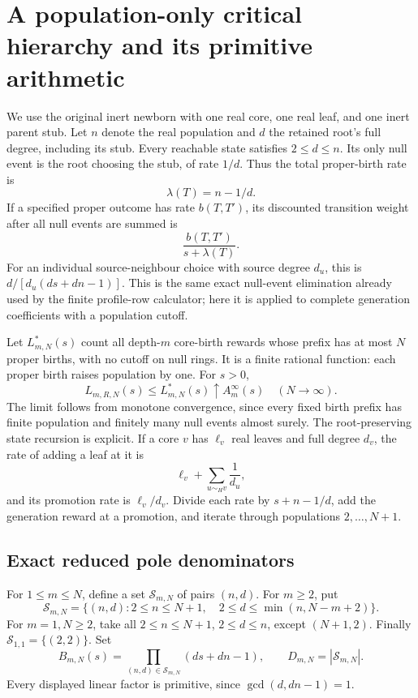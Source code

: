 \section{A population-only critical hierarchy and its primitive arithmetic}
\label{pop:section}

We use the original inert newborn with one real core, one real leaf,
and one inert parent stub. Let $n$ denote the real population and $d$
the retained root's full degree, including its stub. Every reachable
state satisfies $2\le d\le n$. Its only null event is the root choosing
the stub, of rate $1/d$. Thus the total proper-birth rate is
\[
 \lambda(T)=n-1/d.
\]
If a specified proper outcome has rate $b(T,T')$, its discounted
transition weight after all null events are summed is
\[
 \frac{b(T,T')}{s+\lambda(T)}.
\]
For an individual source-neighbour choice with source degree $d_u$,
this is $d/[d_u(ds+dn-1)]$. This is the same exact null-event
elimination already used by the finite profile-row calculator; here
it is applied to complete generation coefficients with a population
cutoff.

Let $L^*_{m,N}(s)$ count all depth-$m$ core-birth rewards whose prefix
has at most $N$ proper births, with no cutoff on null rings. It is a
finite rational function: each proper birth raises population by one.
For $s>0$,
\[
 L_{m,R,N}(s)\le L^*_{m,N}(s)\uparrow A_m^\infty(s)
 \quad(N\to\infty).
\]
The limit follows from monotone convergence, since every fixed birth
prefix has finite population and finitely many null events almost
surely. The root-preserving state recursion is explicit. If a core
$v$ has $\ell_v$ real leaves and full degree $d_v$, the rate of adding
a leaf at it is
\[
 \ell_v+\sum_{u\sim_Hv}\frac1{d_u},
\]
and its promotion rate is $\ell_v/d_v$. Divide each rate by
$s+n-1/d$, add the generation reward at a promotion, and iterate
through populations $2,\ldots,N+1$.

\subsection{Exact reduced pole denominators}

For $1\le m\le N$, define a set $\mathcal S_{m,N}$ of pairs $(n,d)$.
For $m\ge2$, put
\[
 \mathcal S_{m,N}
 =\{(n,d):2\le n\le N+1,\quad
                 2\le d\le\min(n,N-m+2)\}.
\]
For $m=1,N\ge2$, take all $2\le n\le N+1$, $2\le d\le n$,
except $(N+1,2)$. Finally $\mathcal S_{1,1}=\{(2,2)\}$. Set
\[
 B_{m,N}(s)=\prod_{(n,d)\in\mathcal S_{m,N}}(ds+dn-1),
 \qquad D_{m,N}=|\mathcal S_{m,N}|.
\]
Every displayed linear factor is primitive, since $\gcd(d,dn-1)=1$.

